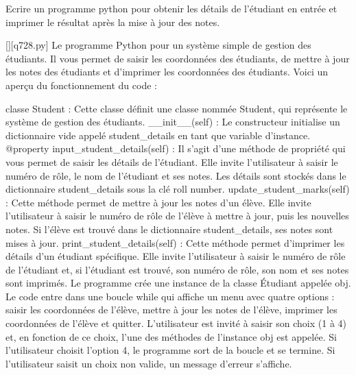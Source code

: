         \question
        Ecrire un programme python pour obtenir les détails de l'étudiant en entrée et imprimer le résultat après la mise à jour des notes.
        \par
        \begin{solution}
            \renewcommand{\nomfichier}{q728.py}
            \pythonfile{\chemincode \nomfichier}[][\nomfichier]
            Le programme Python pour un système simple de gestion des étudiants. Il vous permet de saisir les coordonnées des étudiants, de mettre à jour les notes des étudiants et d'imprimer les coordonnées des étudiants. Voici un aperçu du fonctionnement du code :

    classe Student : Cette classe définit une classe nommée Student, qui représente le système de gestion des étudiants.
    __init__(self) : Le constructeur initialise un dictionnaire vide appelé student_details en tant que variable d'instance.
    @property input_student_details(self) : Il s'agit d'une méthode de propriété qui vous permet de saisir les détails de l'étudiant. Elle invite l'utilisateur à saisir le numéro de rôle, le nom de l'étudiant et ses notes. Les détails sont stockés dans le dictionnaire student_details sous la clé roll number.
    update_student_marks(self) : Cette méthode permet de mettre à jour les notes d'un élève. Elle invite l'utilisateur à saisir le numéro de rôle de l'élève à mettre à jour, puis les nouvelles notes. Si l'élève est trouvé dans le dictionnaire student_details, ses notes sont mises à jour.
    print_student_details(self) : Cette méthode permet d'imprimer les détails d'un étudiant spécifique. Elle invite l'utilisateur à saisir le numéro de rôle de l'étudiant et, si l'étudiant est trouvé, son numéro de rôle, son nom et ses notes sont imprimés.
    Le programme crée une instance de la classe Étudiant appelée obj.
    Le code entre dans une boucle while qui affiche un menu avec quatre options : saisir les coordonnées de l'élève, mettre à jour les notes de l'élève, imprimer les coordonnées de l'élève et quitter.
    L'utilisateur est invité à saisir son choix (1 à 4) et, en fonction de ce choix, l'une des méthodes de l'instance obj est appelée.
    Si l'utilisateur choisit l'option 4, le programme sort de la boucle et se termine.
    Si l'utilisateur saisit un choix non valide, un message d'erreur s'affiche.
        \end{solution}
        


